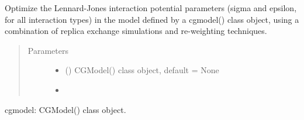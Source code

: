 \documentclass[letterpaper,12pt,english,openany,oneside]{sphinxmanual}
\begin{document}
\begin{fulllineitems}
\label{\detokenize{parameters:parameters.optimize.optimize_lj}}
Optimize the Lennard-Jones interaction potential parameters (sigma and epsilon, for all interaction types) in the model defined by a cgmodel() class object, using a combination of replica exchange simulations and re-weighting techniques.
\begin{quote}\begin{description}
\item[{Parameters}] \leavevmode\begin{itemize}
\item {} 
 () \textendash{} CGModel() class object, default = None

\item {} 
 \textendash{} 

\end{itemize}

\end{description}\end{quote}

cgmodel: CGModel() class object.

\end{fulllineitems}


\begin{fulllineitems}
\label{\detokenize{parameters:parameters.optimize.optimize_model_parameter}}
\end{fulllineitems}


\begin{fulllineitems}
\label{\detokenize{parameters:parameters.optimize.optimize_parameter}}
\end{fulllineitems}
\end{document}
